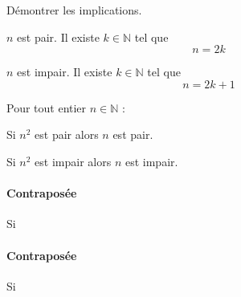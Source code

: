 \begin{exercise}[au programme] Démontrer les implications.
	
	\noindent\parbox{0.48\linewidth}{
		$n$ est pair. Il existe $k\in\mathbb{N}$ tel que
		\[
		n=2k
		\]
	}\hfill \parbox{0.48\linewidth}{
		$n$ est impair. Il existe $k\in\mathbb{N}$ tel que
		\[
		n=2k+1
		\] 
	}
	\vfill 
	\vfill 
\end{exercise}
\begin{theorem} Pour tout entier $n\in\mathbb{N}$ :
	
	\noindent\parbox{0.48\linewidth}{
		Si $n^2$ est pair alors $n$ est pair.
	}\hfill \parbox{0.48\linewidth}{
		Si $n^2$ est impair alors $n$ est impair.
	} 
\end{theorem}
\noindent\parbox{0.48\linewidth}{ 
	\paragraph{Contraposée} Si
}\hfill \parbox{0.48\linewidth}{ 
	\paragraph{Contraposée} Si
}
\vfill 
%	
